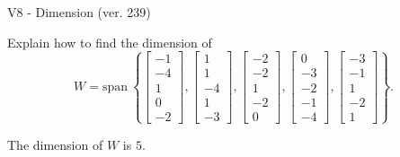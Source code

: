 \begin{exercise}
  \begin{exerciseTitle}V8 - Dimension (ver. 239)\end{exerciseTitle}
  \begin{exerciseStatement}
    Explain how to find the dimension of 
\[W=\mathrm{span}\ \left\{\left[\begin{array}{r}
-1 \\
-4 \\
1 \\
0 \\
-2
\end{array}\right] , \left[\begin{array}{r}
1 \\
1 \\
-4 \\
1 \\
-3
\end{array}\right] , \left[\begin{array}{r}
-2 \\
-2 \\
1 \\
-2 \\
0
\end{array}\right] , \left[\begin{array}{r}
0 \\
-3 \\
-2 \\
-1 \\
-4
\end{array}\right] , \left[\begin{array}{r}
-3 \\
-1 \\
1 \\
-2 \\
1
\end{array}\right]\right\}.\]



  \end{exerciseStatement}
  \begin{exerciseAnswer}
   The dimension of \(W\) is  \(5\).
  


  \end{exerciseAnswer}
\end{exercise}